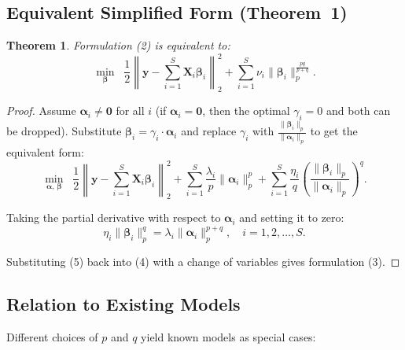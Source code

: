 \documentclass[11pt,a4paper]{article}
\newtheorem{theorem}{Theorem}
\begin{document}
\subsection{Equivalent Simplified Form (Theorem~1)}

\begin{theorem}
Formulation (2) is equivalent to:
\begin{equation}
\min_{\boldsymbol{\beta}} \;\;
\frac{1}{2}\left\|\mathbf{y} - \sum_{i=1}^{S} \mathbf{X}_i \boldsymbol{\beta}_i \right\|_2^2
+ \sum_{i=1}^{S} \nu_i \|\boldsymbol{\beta}_i\|_p^{\frac{pq}{p+q}}.
\end{equation}
\end{theorem}

\begin{proof}
Assume $\boldsymbol{\alpha}_i \neq \mathbf{0}$ for all $i$ (if $\boldsymbol{\alpha}_i = \mathbf{0}$, then the optimal $\gamma_i = 0$ and both can be dropped). Substitute $\boldsymbol{\beta}_i = \gamma_i \cdot \boldsymbol{\alpha}_i$ and replace $\gamma_i$ with $\frac{\|\boldsymbol{\beta}_i\|_p}{\|\boldsymbol{\alpha}_i\|_p}$ to get the equivalent form:
\begin{equation}
\min_{\boldsymbol{\alpha},\,\boldsymbol{\beta}} \;\;
\frac{1}{2}\left\|\mathbf{y} - \sum_{i=1}^{S} \mathbf{X}_i \boldsymbol{\beta}_i \right\|_2^2
+ \sum_{i=1}^{S} \frac{\lambda_i}{p}\|\boldsymbol{\alpha}_i\|_p^p
+ \sum_{i=1}^{S} \frac{\eta_i}{q}\left(\frac{\|\boldsymbol{\beta}_i\|_p}{\|\boldsymbol{\alpha}_i\|_p}\right)^q.
\end{equation}

Taking the partial derivative with respect to $\boldsymbol{\alpha}_i$ and setting it to zero:
\begin{equation}
\eta_i \|\boldsymbol{\beta}_i\|_p^q = \lambda_i \|\boldsymbol{\alpha}_i\|_p^{p+q}, \quad i = 1,2,\ldots,S.
\end{equation}

Substituting (5) back into (4) with a change of variables gives formulation (3). \qedhere
\end{proof}

\subsection{Relation to Existing Models}

Different choices of $p$ and $q$ yield known models as special cases:
\end{document}
